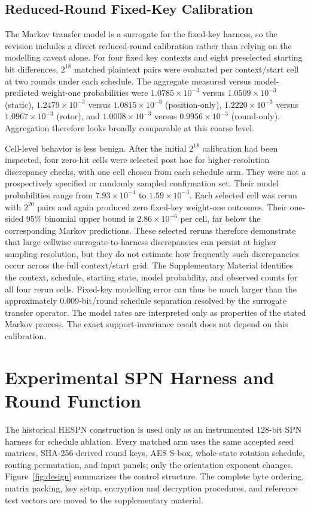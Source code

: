 \documentclass[cryptography,article,submit,oneauthor]{Definitions/mdpi}
\begin{document}
\subsection{Reduced-Round Fixed-Key Calibration}\label{sec:model-calibration}
The Markov transfer model is a surrogate for the fixed-key harness, so the revision includes a direct reduced-round calibration rather than relying on the modelling caveat alone. For four fixed key contexts and eight preselected starting bit differences, $2^{18}$ matched plaintext pairs were evaluated per context/start cell at two rounds under each schedule. The aggregate measured versus model-predicted weight-one probabilities were $1.0785\times10^{-3}$ versus $1.0509\times10^{-3}$ (static), $1.2479\times10^{-3}$ versus $1.0815\times10^{-3}$ (position-only), $1.2220\times10^{-3}$ versus $1.0967\times10^{-3}$ (rotor), and $1.0008\times10^{-3}$ versus $0.9956\times10^{-3}$ (round-only). Aggregation therefore looks broadly comparable at this coarse level.

Cell-level behavior is less benign. After the initial $2^{18}$ calibration had been inspected, four zero-hit cells were selected post hoc for higher-resolution discrepancy checks, with one cell chosen from each schedule arm. They were not a prospectively specified or randomly sampled confirmation set. Their model probabilities range from $7.93\times10^{-4}$ to $1.59\times10^{-3}$. Each selected cell was rerun with $2^{20}$ pairs and again produced zero fixed-key weight-one outcomes. Their one-sided 95\% binomial upper bound is $2.86\times10^{-6}$ per cell, far below the corresponding Markov predictions. These selected reruns therefore demonstrate that large cellwise surrogate-to-harness discrepancies can persist at higher sampling resolution, but they do not estimate how frequently such discrepancies occur across the full context/start grid. The Supplementary Material identifies the context, schedule, starting state, model probability, and observed counts for all four rerun cells. Fixed-key modelling error can thus be much larger than the approximately $0.009$-bit/round schedule separation resolved by the surrogate transfer operator. The model rates are interpreted only as properties of the stated Markov process. The exact support-invariance result does not depend on this calibration.

\section{Experimental SPN Harness and Round Function}\label{sec:4}
The historical HESPN construction is used only as an instrumented 128-bit SPN harness for schedule ablation. Every matched arm uses the same accepted seed matrices, SHA-256-derived round keys, AES S-box, whole-state rotation schedule, routing permutation, and input panels; only the orientation exponent changes. Figure~\ref{fig:design} summarizes the control structure. The complete byte ordering, matrix packing, key setup, encryption and decryption procedures, and reference test vectors are moved to the supplementary material.
\end{document}
